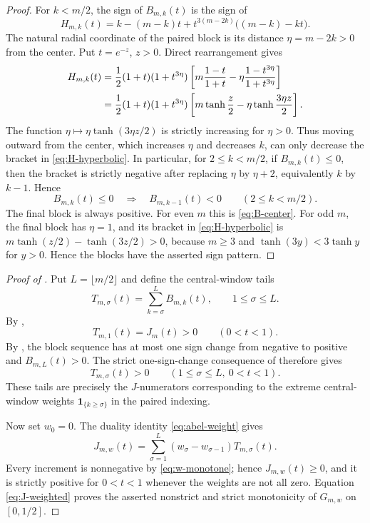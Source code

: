 \documentclass[11pt,a4paper]{amsart}
\numberwithin{equation}{section}
\theoremstyle{plain}
\theoremstyle{definition}
\begin{document}
\begin{proof}
For \(k<m/2\), the sign of \(B_{m,k}(t)\) is the sign of
\[
 H_{m,k}(t)
 =k-(m-k)t+t^{3(m-2k)}\bigl((m-k)-kt\bigr).
\]
The natural radial coordinate of the paired block is its distance
\(\eta=m-2k>0\) from the center.  Put \(t=e^{-z}\), \(z>0\).  Direct rearrangement
gives
\begin{align}
 H_{m,k}(t)
 &=\frac12(1+t)(1+t^{3\eta})
 \left[
 m\frac{1-t}{1+t}
 -\eta\frac{1-t^{3\eta}}{1+t^{3\eta}}
 \right]\notag\\
 &=\frac12(1+t)(1+t^{3\eta})
 \left[m\tanh\frac{z}{2}-\eta\tanh\frac{3\eta z}{2}\right].
 \label{eq:H-hyperbolic}
\end{align}
The function \(\eta\mapsto \eta\tanh(3\eta z/2)\) is strictly increasing for \(\eta>0\).
Thus moving outward from the center, which increases \(\eta\) and decreases \(k\),
can only decrease the bracket in \eqref{eq:H-hyperbolic}.  In particular, for
\(2\le k<m/2\), if \(B_{m,k}(t)\le0\), then the bracket is strictly negative
after replacing \(\eta\) by \(\eta+2\), equivalently \(k\) by \(k-1\).  Hence
\[
 B_{m,k}(t)\le0\quad\Longrightarrow\quad B_{m,k-1}(t)<0
 \qquad(2\le k<m/2).
\]
The final block is always positive.  For even \(m\) this is \eqref{eq:B-center}.
For odd \(m\), the final block has \(\eta=1\), and its bracket in
\eqref{eq:H-hyperbolic} is \(m\tanh(z/2)-\tanh(3z/2)>0\),
because \(m\ge3\) and \(\tanh(3y)<3\tanh y\) for \(y>0\).  Hence the blocks have the
asserted sign pattern.
\end{proof}

\begin{proof}[Proof of ]
Put \(L=\lfloor m/2\rfloor\) and define the central-window tails
\[
 T_{m,\sigma}(t)=\sum_{k=\sigma}^L B_{m,k}(t),
 \qquad 1\le \sigma\le L.
\]
By ,
\[
 T_{m,1}(t)=J_m(t)>0
 \qquad(0<t<1).
\]
By , the block sequence has at most one sign change from
negative to positive and \(B_{m,L}(t)>0\).  The strict one-sign-change
consequence of  therefore gives
\[
 T_{m,\sigma}(t)>0
 \qquad(1\le \sigma\le L,\ 0<t<1).
\]
These tails are precisely the \(J\)-numerators corresponding to the extreme
central-window weights \(\mathbf1_{\{k\ge \sigma\}}\) in the paired indexing.

Now set \(w_0=0\).  The duality identity \eqref{eq:abel-weight} gives
\[
 J_{m,w}(t)
 =\sum_{\sigma=1}^L(w_\sigma-w_{\sigma-1})T_{m,\sigma}(t).
\]
Every increment is nonnegative by \eqref{eq:w-monotone}; hence
\(J_{m,w}(t)\ge0\), and it is strictly positive for \(0<t<1\) whenever the
weights are not all zero.  Equation \eqref{eq:J-weighted} proves the asserted
nonstrict and strict monotonicity of \(G_{m,w}\) on \([0,1/2]\).
\end{proof}
\end{document}
